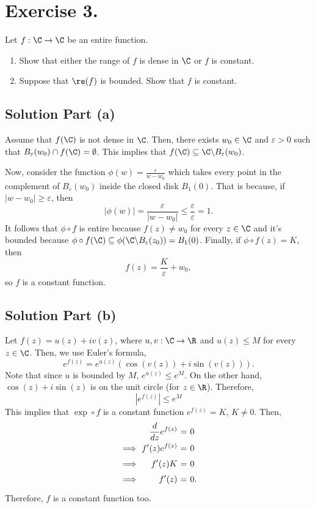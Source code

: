 \section*{Exercise 3.}

Let $f:\C\to\C$ be an entire function.
\begin{enumerate}[label=(\alph*)]
    \item Show that either the range of $f$ is dense in $\C$ or $f$ is constant.
    \item Suppose that $\re(f)$ is bounded. Show that $f$ is constant.
\end{enumerate} 

\subsection*{Solution Part (a)}

Assume that $f(\C)$ is not dense in $\C$. Then, there exists $w_0\in \C$ and $\varepsilon>0$ such that $B_\varepsilon(w_0) \cap f(\C) = \emptyset$. This implies that $f(\C) \subseteq \C \backslash B_\varepsilon(w_0)$.

Now, consider the function $\phi(w) = \frac{\varepsilon}{w-w_0}$ which takes every point in the complement of $B_\varepsilon(w_0)$ inside the closed disk $B_1(0)$. That is because, if $|w-w_0| \geq \varepsilon$, then
\[ |\phi(w)| = \frac{\varepsilon}{|w-w_0|} \leq \frac{\varepsilon}{\varepsilon} = 1.  \]
It follows that $\phi \circ f$ is entire because $f(z) \neq w_0$ for every $z \in \C$ and it's bounded because $\phi \circ f(\C) \subseteq \phi(\C \backslash B_\varepsilon(z_0)) = B_1(0)$. Finally, if $\phi\circ f(z) = K$, then
\[ f(z) = \frac{K}{\varepsilon} + w_0, \]
so $f$ is a constant function.

\subsection*{Solution Part (b)}

Let $f(z) = u(z) + iv(z)$, where $u,v: \C \to \R$ and $u(z) \leq M$ for every $z\in\C$. Then, we use Euler's formula,
\[ e^{f(z)} = e^{u(z)} (\cos(v(z)) + i \sin(v(z))). \]
Note that since $u$ is bounded by $M$, $e^{u(z)} \leq e^{M}$. On the other hand, $\cos(z) + i \sin(z)$ is on the unit circle (for $z\in \R$). Therefore,
\[ |e^{f(z)}| \leq e^M   \]
This implies that $\exp\circ f$ is a constant function $e^{f(z)} = K$, $K\neq 0$. Then,
\[ \everymath{\displaystyle}
\arraycolsep=1.8pt\def\arraystretch{1.5}
\begin{array}{rrcl}
    & \frac{d}{dz} e^{f(z)} & = & 0\\
    \implies & f'(z) e^{f(z)} & = & 0\\
    \implies & f'(z) K & = & 0\\
    \implies & f'(z) & = & 0.
\end{array} \]
Therefore, $f$ is a constant function too.